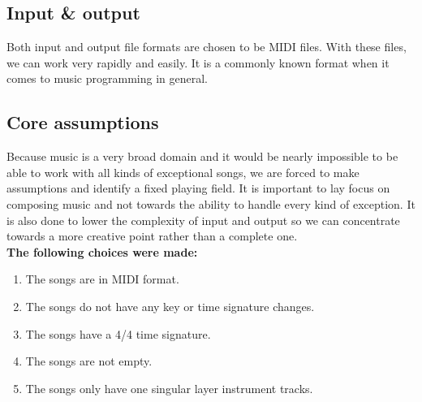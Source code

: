 \documentclass[a4paper]{article}
\begin{document}
\subsection{Input \& output}
Both input and output file formats are chosen to be MIDI files. With these files, we can work very rapidly and easily. It is a commonly known format when it comes to music programming in general.

\subsection{Core assumptions}
Because music is a very broad domain and it would be nearly impossible to be able to work with all kinds of exceptional songs, we are forced to make assumptions and identify a fixed playing field. It is important to lay focus on composing music and not towards the ability to handle every kind of exception. It is also done to lower the complexity of input and output so we can concentrate towards a more creative point rather than a complete one.\\
\newline
\textbf{The following choices were made:}
\begin{enumerate}
	\item The songs are in MIDI format.
	\item The songs do not have any key or time signature changes.
	\item The songs have a 4/4 time signature.
	\item The songs are not empty.
	\item The songs only have one singular layer instrument tracks.
\end{enumerate}
\end{document}
